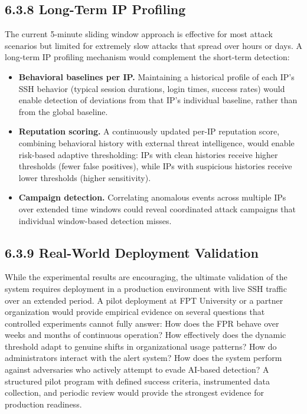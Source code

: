 \documentclass[
  a4paper]{report}
\providecommand{\tightlist}{%
  \setlength{\itemsep}{0pt}\setlength{\parskip}{0pt}}
\begin{document}
\subsection{6.3.8 Long-Term IP Profiling}\label{long-term-ip-profiling}

The current 5-minute sliding window approach is effective for most
attack scenarios but limited for extremely slow attacks that spread over
hours or days. A long-term IP profiling mechanism would complement the
short-term detection:

\begin{itemize}
\tightlist
\item
  \textbf{Behavioral baselines per IP.} Maintaining a historical profile
  of each IP's SSH behavior (typical session durations, login times,
  success rates) would enable detection of deviations from that IP's
  individual baseline, rather than from the global baseline.
\item
  \textbf{Reputation scoring.} A continuously updated per-IP reputation
  score, combining behavioral history with external threat intelligence,
  would enable risk-based adaptive thresholding: IPs with clean
  histories receive higher thresholds (fewer false positives), while IPs
  with suspicious histories receive lower thresholds (higher
  sensitivity).
\item
  \textbf{Campaign detection.} Correlating anomalous events across
  multiple IPs over extended time windows could reveal coordinated
  attack campaigns that individual window-based detection misses.
\end{itemize}

\subsection{6.3.9 Real-World Deployment
Validation}\label{real-world-deployment-validation}

While the experimental results are encouraging, the ultimate validation
of the system requires deployment in a production environment with live
SSH traffic over an extended period. A pilot deployment at FPT
University or a partner organization would provide empirical evidence on
several questions that controlled experiments cannot fully answer: How
does the FPR behave over weeks and months of continuous operation? How
effectively does the dynamic threshold adapt to genuine shifts in
organizational usage patterns? How do administrators interact with the
alert system? How does the system perform against adversaries who
actively attempt to evade AI-based detection? A structured pilot program
with defined success criteria, instrumented data collection, and
periodic review would provide the strongest evidence for production
readiness.
\end{document}
